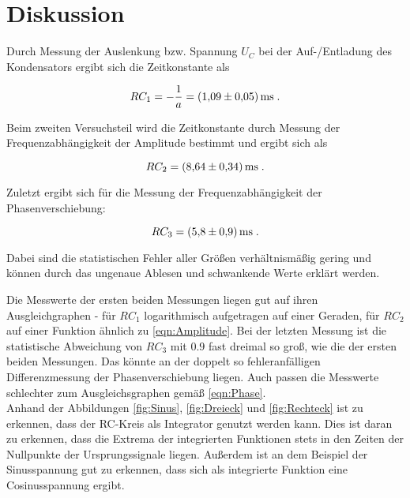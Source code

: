 \section{Diskussion}
\label{sec:Diskussion}

Durch Messung der Auslenkung bzw. Spannung $U_C$ bei der Auf-/Entladung des Kondensators 
ergibt sich die Zeitkonstante als

\begin{equation*}
RC_1 = -\frac{1}{a} = \SI{1.09+-0.05}{\milli\second} \; .
\end{equation*}

Beim zweiten Versuchsteil wird die Zeitkonstante durch Messung der Frequenzabhängigkeit der
Amplitude bestimmt und ergibt sich als

\begin{equation*}
RC_2 = \SI{8.64+-0.34}{\milli\second} \; .
\end{equation*}

Zuletzt ergibt sich für die Messung der Frequenzabhängigkeit der Phasenverschiebung:

\begin{equation*}
    RC_3 = \SI{5.8+-0.9}{\milli\second} \; .
\end{equation*}

Dabei sind die statistischen Fehler aller Größen verhältnismäßig gering und können durch das ungenaue
Ablesen und schwankende Werte erklärt werden.

Die Messwerte der ersten
beiden Messungen liegen gut auf ihren Ausgleichgraphen - für $RC_1$ logarithmisch aufgetragen auf einer Geraden,
für $RC_2$ auf einer Funktion ähnlich zu \eqref{eqn:Amplitude}. Bei der letzten Messung ist die statistische
Abweichung von $RC_3$ mit $0.9$ fast dreimal so groß, wie die der ersten beiden Messungen. Das könnte an der doppelt
so fehleranfälligen Differenzmessung der Phasenverschiebung liegen. Auch passen die Messwerte schlechter zum Ausgleichsgraphen
gemäß \eqref{eqn:Phase}.\\
Anhand der Abbildungen \ref{fig:Sinus}, \ref{fig:Dreieck} und \ref{fig:Rechteck} ist zu
erkennen, dass der RC-Kreis als Integrator genutzt werden kann. Dies ist daran zu erkennen, 
dass die Extrema der integrierten Funktionen stets in den Zeiten der Nullpunkte der 
Ursprungssignale liegen. Außerdem ist an dem Beispiel der Sinusspannung gut zu erkennen, 
dass sich als integrierte Funktion eine Cosinusspannung ergibt.